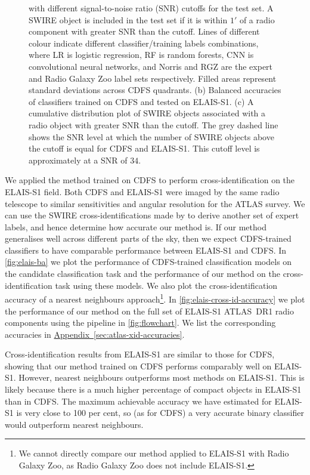 \documentclass[11pt, a4paper]{book}
\newcommand{\aref}[1]{\hyperref[#1]{Appendix~\ref{#1}}}
\begin{document}
\begin{figure}
{      with different signal-to-noise ratio (SNR) cutoffs for the test set. A
      SWIRE object is included in the test set if it is within $1'$ of a radio
      component with greater SNR than the cutoff. Lines of different colour
      indicate different classifier/training labels combinations, where LR is
      logistic regression, RF is random forests, CNN is convolutional neural
      networks, and Norris and RGZ are the expert and Radio Galaxy Zoo label
      sets respectively. Filled areas represent standard deviations across
      CDFS quadrants. (b) Balanced accuracies of classifiers trained on CDFS
      and tested on ELAIS-S1. (c) A cumulative distribution plot of SWIRE
      objects associated with a radio object with greater SNR than the cutoff.
      The grey dashed line shows the SNR level at which the number of SWIRE
      objects above the cutoff is equal for CDFS and ELAIS-S1. This cutoff level
      is approximately at a SNR of $34$.}
    \label{fig:accuracies-flux}
  \end{figure}

  We applied the method trained on CDFS to perform cross-identification on the
  ELAIS-S1 field. Both CDFS and ELAIS-S1 were imaged by the same radio
  telescope to similar sensitivities and angular resolution for the ATLAS
  survey. {We can use the SWIRE cross-identifications made by
  \citet{middelberg08} to derive another set of expert labels, and hence
  determine how accurate our method is. If our method generalises well across
  different parts of the sky, then we expect CDFS-trained classifiers to have
  comparable performance between ELAIS-S1 and CDFS}. In \autoref{fig:elais-ba}
  we plot the performance of CDFS-trained classification models on the candidate classification task and
  the performance of our method on the cross-identification task using these models. We also plot
  the cross-identification accuracy of a nearest neighbours approach\footnote{{We cannot
  directly compare our method applied to ELAIS-S1 with Radio Galaxy Zoo, as
  Radio Galaxy Zoo does not include ELAIS-S1.}}. In
  \autoref{fig:elais-cross-id-accuracy} we plot the performance of our method
  on the full set of ELAIS-S1 ATLAS~DR1 radio components using the pipeline in
  \autoref{fig:flowchart}. We list the corresponding accuracies in
  \aref{sec:atlas-xid-accuracies}.

  Cross-identification results from ELAIS-S1 are similar to those for CDFS,
  showing that our method trained on CDFS performs comparably well on
  ELAIS-S1. However, nearest neighbours outperforms most methods on ELAIS-S1.
  This is likely because there is a much higher percentage of compact objects
  in ELAIS-S1 than in CDFS. The maximum achievable accuracy we have estimated
  for ELAIS-S1 is very close to 100 per cent, so (as for CDFS) a very accurate
  binary classifier would outperform nearest neighbours.
\end{document}
